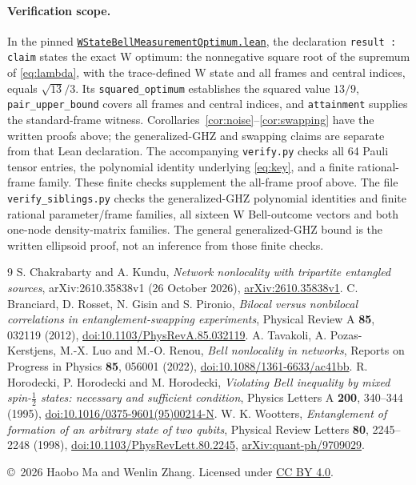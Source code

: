 \documentclass[11pt,a4paper]{article}
\begin{document}
\paragraph{Verification scope.}
In the pinned
\href{https://github.com/the-omega-institute/trureturing/blob/a252cc46f0e145418a978217b8abd41a73fd820d/D5/S3/Quantum/MeasurementGeometry/WStateBellMeasurementOptimum.lean}{\texttt{WStateBellMeasurementOptimum.lean}},
the declaration \texttt{result : claim} states the exact W optimum: the nonnegative
square root of the supremum of
\eqref{eq:lambda}, with the trace-defined W state and all frames and central
indices, equals $\sqrt{13}/3$. Its \texttt{squared\_optimum} establishes
the squared value $13/9$, \texttt{pair\_upper\_bound} covers all frames
and central indices, and \texttt{attainment} supplies the standard-frame
witness. Corollaries~\ref{cor:noise}--\ref{cor:swapping} have the written
proofs above; the generalized-GHZ and swapping claims are separate from
that Lean declaration. The accompanying
\texttt{verify.py} checks all 64 Pauli tensor entries, the polynomial identity
underlying \eqref{eq:key}, and a finite rational-frame family. These finite
checks supplement the all-frame proof above. The file
\texttt{verify\_siblings.py} checks the generalized-GHZ polynomial
identities and finite rational parameter/frame families, all sixteen
W Bell-outcome vectors and both one-node density-matrix families. The general
generalized-GHZ bound is the written ellipsoid proof, not an inference
from those finite checks.

\begin{thebibliography}{9}
 S. Chakrabarty and A. Kundu,
\emph{Network nonlocality with tripartite entangled sources},
arXiv:2610.35838v1 (26 October 2026),
\href{https://arxiv.org/abs/2610.35838v1}{arXiv:2610.35838v1}.
 C. Branciard, D. Rosset, N. Gisin and S. Pironio,
\emph{Bilocal versus nonbilocal correlations in entanglement-swapping
experiments}, Physical Review A \textbf{85}, 032119 (2012),
\href{https://doi.org/10.1103/PhysRevA.85.032119}{doi:10.1103/PhysRevA.85.032119}.
 A. Tavakoli, A. Pozas-Kerstjens, M.-X. Luo and M.-O. Renou,
\emph{Bell nonlocality in networks}, Reports on Progress in Physics
\textbf{85}, 056001 (2022),
\href{https://doi.org/10.1088/1361-6633/ac41bb}{doi:10.1088/1361-6633/ac41bb}.
 R. Horodecki, P. Horodecki and M. Horodecki,
\emph{Violating Bell inequality by mixed spin-$\frac12$ states:
necessary and sufficient condition}, Physics Letters A \textbf{200},
340--344 (1995),
\href{https://doi.org/10.1016/0375-9601(95)00214-N}{doi:10.1016/0375-9601(95)00214-N}.
 W. K. Wootters,
\emph{Entanglement of formation of an arbitrary state of two qubits},
Physical Review Letters \textbf{80}, 2245--2248 (1998),
\href{https://doi.org/10.1103/PhysRevLett.80.2245}{doi:10.1103/PhysRevLett.80.2245},
\href{https://arxiv.org/abs/quant-ph/9709029}{arXiv:quant-ph/9709029}.
\end{thebibliography}
\medskip\noindent\small
\copyright\ 2026 Haobo Ma and Wenlin Zhang.
Licensed under \href{https://creativecommons.org/licenses/by/4.0/}{CC BY 4.0}.
\end{document}
